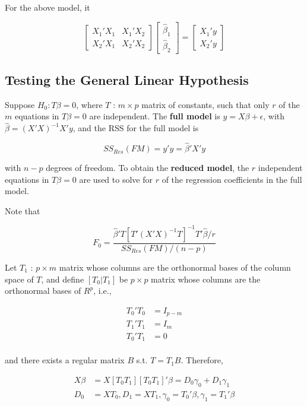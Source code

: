 \documentclass[12pt]{article}
\begin{document}
For the above model, it 

$$
\begin{bmatrix}
X_1'X_1 & X_1' X_2 \\
X_2'X_1 & X_2' X_2
\end{bmatrix}
\begin{bmatrix}
\hat{\beta}_1 \\
\hat{\beta}_2
\end{bmatrix} = 
\begin{bmatrix}
X_1'y \\
X_2'y
\end{bmatrix}
$$


\subsection{Testing the General Linear Hypothesis}

Suppose $H_0 : T \beta = 0$, where $T$ : $m \times p$ matrix of constants, such that only $r$ of the $m$ equations in $T \beta = 0$ are independent. The \textbf{full model} is $y = X \beta + \epsilon$, with $\hat{\beta} = (X'X)^{-1} X' y$, and the RSS for the full model is 

$$
SS_{Res} (FM) = y' y = \hat{\beta}' X' y
$$

with $n - p$ degrees of freedom. To obtain the \textbf{reduced model}, the $r$ independent equations in $T \beta = 0$ are used to solve for $r$ of the regression coefficients in the full model. 

Note that

$$
F_0 = \frac{\hat{\beta}' T [ T' (X'X)^{-1} T]^{-1} T' \hat{\beta}/r}{SS_{Res}(FM)/(n-p)}
$$


Let $T_1$ : $p \times m$ matrix whose columns are the orthonormal bases of the column space of $T$, and define $[T_0 | T_1]$ be $p \times p$ matrix whose columns are the orthonormal bases of $R^{p}$, i.e.,

$$
\begin{aligned}
T_0' T_0 &= I_{p - m} \\[8pt]
T_1' T_1 &= I_m \\[8pt]
T_0' T_1 &= 0 \\[8pt]
\end{aligned}
$$

and there exists a regular matrix $B$ s.t. $T = T_1B$. Therefore, 


$$
\begin{aligned}
X \beta &= X [T_0 T_1] [T_0 T_1]' \beta = D_0 \gamma_0 + D_1 \gamma_1 \\[8pt]
D_0 &= XT_0, D_1 = X T_1, \gamma_0 = T_0' \beta, \gamma_1 = T_1' \beta \\[8pt]
\end{aligned}
$$
\end{document}
